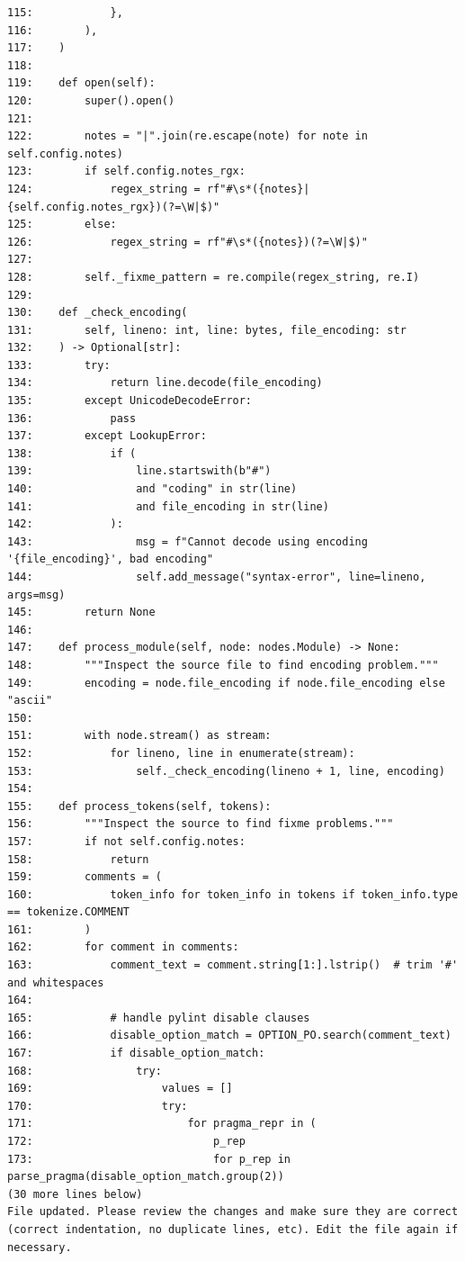 {\begin{observationbox}
\begin{Verbatim}[breaklines=true, breakanywhere=true]
115:            },
116:        ),
117:    )
118:
119:    def open(self):
120:        super().open()
121:
122:        notes = "|".join(re.escape(note) for note in self.config.notes)
123:        if self.config.notes_rgx:
124:            regex_string = rf"#\s*({notes}|{self.config.notes_rgx})(?=\W|$)"
125:        else:
126:            regex_string = rf"#\s*({notes})(?=\W|$)"
127:
128:        self._fixme_pattern = re.compile(regex_string, re.I)
129:
130:    def _check_encoding(
131:        self, lineno: int, line: bytes, file_encoding: str
132:    ) -> Optional[str]:
133:        try:
134:            return line.decode(file_encoding)
135:        except UnicodeDecodeError:
136:            pass
137:        except LookupError:
138:            if (
139:                line.startswith(b"#")
140:                and "coding" in str(line)
141:                and file_encoding in str(line)
142:            ):
143:                msg = f"Cannot decode using encoding '{file_encoding}', bad encoding"
144:                self.add_message("syntax-error", line=lineno, args=msg)
145:        return None
146:
147:    def process_module(self, node: nodes.Module) -> None:
148:        """Inspect the source file to find encoding problem."""
149:        encoding = node.file_encoding if node.file_encoding else "ascii"
150:
151:        with node.stream() as stream:
152:            for lineno, line in enumerate(stream):
153:                self._check_encoding(lineno + 1, line, encoding)
154:
155:    def process_tokens(self, tokens):
156:        """Inspect the source to find fixme problems."""
157:        if not self.config.notes:
158:            return
159:        comments = (
160:            token_info for token_info in tokens if token_info.type == tokenize.COMMENT
161:        )
162:        for comment in comments:
163:            comment_text = comment.string[1:].lstrip()  # trim '#' and whitespaces
164:
165:            # handle pylint disable clauses
166:            disable_option_match = OPTION_PO.search(comment_text)
167:            if disable_option_match:
168:                try:
169:                    values = []
170:                    try:
171:                        for pragma_repr in (
172:                            p_rep
173:                            for p_rep in parse_pragma(disable_option_match.group(2))
(30 more lines below)
File updated. Please review the changes and make sure they are correct (correct indentation, no duplicate lines, etc). Edit the file again if necessary.


\end{Verbatim}
\end{observationbox}}
